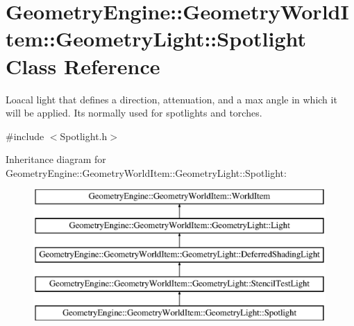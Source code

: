 \hypertarget{class_geometry_engine_1_1_geometry_world_item_1_1_geometry_light_1_1_spotlight}{}\section{Geometry\+Engine\+::Geometry\+World\+Item\+::Geometry\+Light\+::Spotlight Class Reference}
\label{class_geometry_engine_1_1_geometry_world_item_1_1_geometry_light_1_1_spotlight}


Loacal light that defines a direction, attenuation, and a max angle in which it will be applied. It\textquotesingle{}s normally used for spotlights and torches.  




{\ttfamily \#include $<$Spotlight.\+h$>$}

Inheritance diagram for Geometry\+Engine\+::Geometry\+World\+Item\+::Geometry\+Light\+::Spotlight\+:\begin{figure}[H]
\begin{center}
\leavevmode
\includegraphics[height=5.000000cm]{class_geometry_engine_1_1_geometry_world_item_1_1_geometry_light_1_1_spotlight}
\end{center}
\end{figure}
